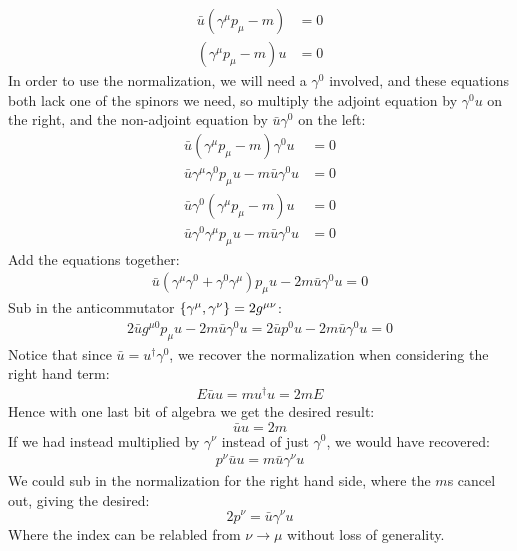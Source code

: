 \documentclass[12pt]{article}
\begin{document}
\begin{align*}
  \bar{u}(\gamma^\mu p_\mu-m)&=0\\
  (\gamma^\mu p_\mu-m)u&=0
\end{align*}
In order to use the normalization, we will need a $\gamma^0$ involved, and these equations both lack one of the spinors we need, so multiply the adjoint equation by $\gamma^0u$ on the right, and the non-adjoint equation by $\bar{u}\gamma^0$ on the left:
\begin{align*}
  \bar{u}(\gamma^\mu p_\mu-m)\gamma^0u&=0\\
  \bar{u}\gamma^\mu\gamma^0p_\mu u-m\bar{u}\gamma^0u&=0\\
  \bar{u}\gamma^0(\gamma^\mu p_\mu-m)u&=0\\
  \bar{u}\gamma^0\gamma^\mu p_\mu u-m\bar{u}\gamma^0u&=0
\end{align*}
Add the equations together:
\begin{align*}
  \bar{u}(\gamma^\mu\gamma^0+\gamma^0\gamma^\mu)p_\mu u-2m\bar{u}\gamma^0u=0
\end{align*}
Sub in the anticommutator $\acomm{\gamma^\mu}{\gamma^\nu}=2g^{\mu\nu}$:
\begin{align*}
  2\bar{u}g^{\mu0}p_\mu u-2m\bar{u}\gamma^0u=
  2\bar{u}p^0 u-2m\bar{u}\gamma^0u=0
\end{align*}
Notice that since $\bar{u}=u^\dag\gamma^0$, we recover the normalization when considering the right hand term:
\begin{align*}
  E\bar{u}u=mu^\dag u=2mE
\end{align*}
Hence with one last bit of algebra we get the desired result:
\begin{equation}
  \label{eq:p8b}
  \boxed{\bar{u}u=2m}
\end{equation}
If we had instead multiplied by $\gamma^\nu$ instead of just $\gamma^0$, we would have recovered:
\begin{align*}
  p^\nu\bar{u}u=m\bar{u}\gamma^\nu u
\end{align*}
We could sub in the normalization for the right hand side, where the $m$s cancel out, giving the desired:
\begin{equation}
  \label{eq:p8c}
  \boxed{2p^\nu=\bar{u}\gamma^\nu u}
\end{equation}
Where the index can be relabled from $\nu\to\mu$ without loss of generality.
\end{document}
